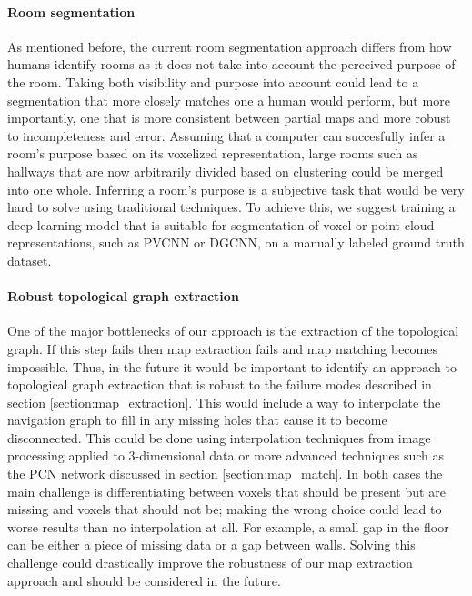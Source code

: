\paragraph{Room segmentation}
As mentioned before, the current room segmentation approach differs from how humans identify rooms as it does not take into account the perceived purpose of the room. Taking both visibility and purpose into account could lead to a segmentation that more closely matches one a human would perform, but more importantly, one that is more consistent between partial maps and more robust to incompleteness and error. Assuming that a computer can succesfully infer a room's purpose based on its voxelized representation, large rooms such as hallways that are now arbitrarily divided based on clustering could be merged into one whole. Inferring a room's purpose is a subjective task that would be very hard to solve using traditional techniques. To achieve this, we suggest training a deep learning model that is suitable for segmentation of voxel or point cloud representations, such as PVCNN or DGCNN, on a manually labeled ground truth dataset. 

\paragraph{Robust topological graph extraction}
One of the major bottlenecks of our approach is the extraction of the topological graph. If this step fails then map extraction fails and map matching becomes impossible. Thus, in the future it would be important to identify an approach to topological graph extraction that is robust to the failure modes described in section \ref{section:map_extraction}. This would include a way to interpolate the navigation graph to fill in any missing holes that cause it to become disconnected. This could be done using interpolation techniques from image processing applied to 3-dimensional data or more advanced techniques such as the PCN network discussed in section \ref{section:map_match}. In both cases the main challenge is differentiating between voxels that should be present but are missing and voxels that should not be; making the wrong choice could lead to worse results than no interpolation at all. For example, a small gap in the floor can be either a piece of missing data or a gap between walls. Solving this challenge could drastically improve the robustness of our map extraction approach and should be considered in the future.

